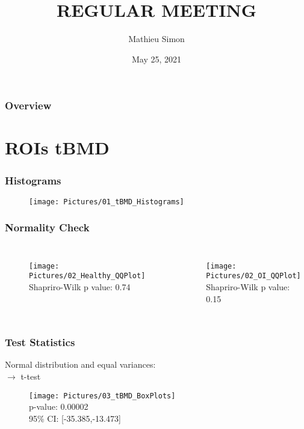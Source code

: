 \documentclass[xcolor=table]{beamer}
\title[Regular Meeting]{
\uppercase{Regular Meeting}
}
\author{Mathieu Simon}
\institute[University of Bern]
{
MSc - Biomedical Engineering \\
University of Bern, Faculty of Medicine \\
\medskip
}
\date{May 25, 2021}
\begin{document}
\begin{frame}
\titlepage
\end{frame}


\begin{frame}
	\frametitle{Overview}
	\tableofcontents
\end{frame}


\section{ROIs tBMD}

\begin{frame}
	\frametitle{Histograms}
	\begin{figure}
		\texttt{[image: Pictures/01\_tBMD\_Histograms]}
	\end{figure}
\end{frame}

\begin{frame}
	\frametitle{Normality Check}
	\begin{columns}
		\centering
		\begin{figure}
			\texttt{[image: Pictures/02\_Healthy\_QQPlot]}\\
			Shapriro-Wilk p value: 0.74
		\end{figure}
		\centering
		\begin{figure}
			\texttt{[image: Pictures/02\_OI\_QQPlot]}\\
			Shapriro-Wilk p value: 0.15
		\end{figure}
	\end{columns}
\end{frame}

\begin{frame}
	\frametitle{Test Statistics}
	Normal distribution and equal variances:\\
	$\rightarrow$ t-test
	\begin{figure}
		\texttt{[image: Pictures/03\_tBMD\_BoxPlots]}\\
		p-value: 0.00002\\
		95\% CI: [-35.385,-13.473]
	\end{figure}
\end{frame}
\end{document}
